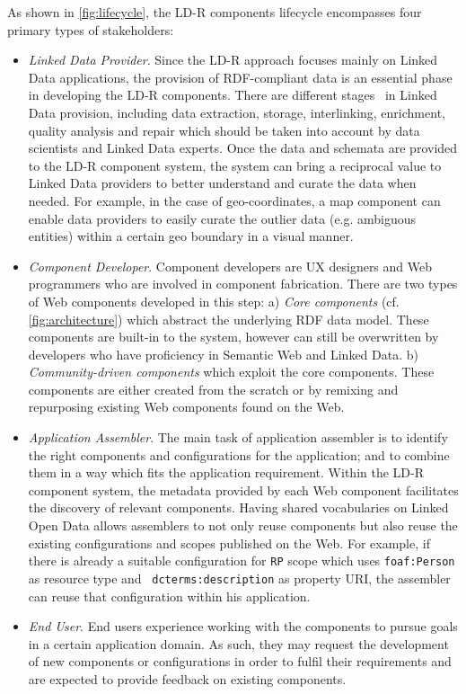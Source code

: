 \documentclass{acm_proc_article-sp}
\begin{document}
As shown in \autoref{fig:lifecycle}, the LD-R components lifecycle encompasses four primary types of stakeholders:

\begin{itemize}

\item \emph{Linked Data Provider}.
Since the LD-R approach focuses mainly on Linked Data applications, the provision of RDF-compliant data is an essential phase in developing the LD-R components.
There are different stages~\cite{AuerLOD2} in Linked Data provision, including data extraction, storage, interlinking, enrichment, quality analysis and repair which should be taken into account by data scientists and Linked Data experts.
Once the data and schemata are provided to the LD-R component system, the system can bring a reciprocal value to Linked Data providers to better understand and curate the data when needed.
For example, in the case of geo-coordinates, a map component can enable data providers to easily curate the outlier data (e.g. ambiguous entities) within a certain geo boundary in a visual manner.

\item \emph{Component Developer}. 
Component developers are UX designers and Web programmers who are involved in component fabrication.
There are two types of Web components developed in this step:
a) \emph{Core components} (cf. \autoref{fig:architecture}) which abstract the underlying RDF data model.
These components are built-in to the system, however can still be overwritten by developers who have proficiency in Semantic Web and Linked Data.
b) \emph{Community-driven components} which exploit the core components.
These components are either created from the scratch or by remixing and repurposing existing Web components found on the Web.

\item \emph{Application Assembler}.
The main task of application assembler is to identify the right components and configurations for the application; and to combine them in a way which fits the application requirement. 
Within the LD-R component system, the metadata provided by each Web component facilitates the discovery of relevant components.
Having shared vocabularies on Linked Open Data allows assemblers to not only reuse components but also reuse the existing configurations and scopes published on the Web.
For example, if there is already a suitable configuration for \texttt{RP} scope which uses \texttt{foaf:Person} as resource type and ~\texttt{dcterms:description} as property URI, the assembler can reuse that configuration within his application.

\item \emph{End User}. 
End users experience working with the components to pursue goals in a certain application domain.
As such, they may request the development of new components or configurations in order to fulfil their requirements and are expected to provide feedback on existing components.

\end{itemize}
\end{document}
